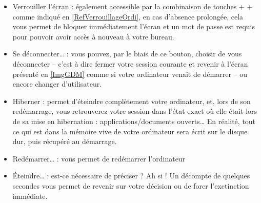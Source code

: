 \begin{itemize}
\item Verrouiller l'écran : également accessible par la combinaison de touches  +  +  comme indiqué en \ref{RefVerrouillageOrdi}, en cas d'absence prolongée, cela vous permet de bloquer immédiatement l'écran et un mot de passe est requis pour pouvoir avoir accès à nouveau à votre bureau.
\item Se déconnecter\ldots{} : vous pouvez, par le biais de ce bouton, choisir de vous déconnecter -- c'est à dire fermer votre session courante et revenir à l'écran présenté en \ref{ImgGDM} comme si votre ordinateur venait de démarrer -- ou encore changer d'utilisateur.
\item Hiberner : permet d'éteindre complètement votre ordinateur, et, lors de son redémarrage, vous retrouverez votre session dans l'état exact où elle était lors de sa mise en hibernation : applications/documents ouverts\ldots{} En réalité, tout ce qui est dans la mémoire vive de votre ordinateur sera écrit sur le disque dur, puis récupéré au démarrage.
\item Redémarrer\ldots{} : vous permet de redémarrer l'ordinateur
\item Éteindre\ldots{} : est-ce nécessaire de préciser ? Ah si ! Un décompte de quelques secondes vous permet de revenir sur votre décision ou de forcr l'exctinction immédiate.
\end{itemize}
\SessionIndicator
